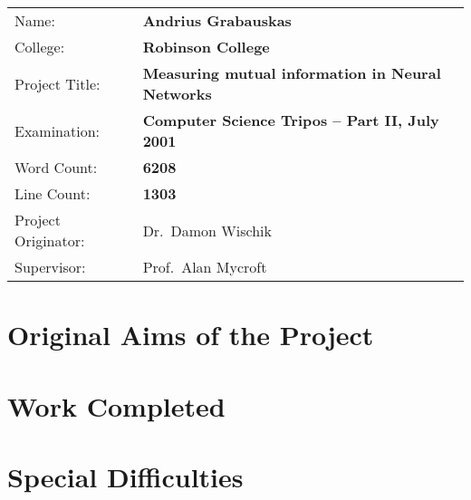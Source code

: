 {\large
\begin{tabular}{ll}
Name:               & \bf Andrius Grabauskas                    \\
College:            & \bf Robinson College                      \\
Project Title:      & \bf Measuring mutual information in Neural Networks \\
Examination:        & \bf Computer Science Tripos -- Part II, July 2001  \\
Word Count:         & \bf 6208\footnotemark[1] \\
Line Count:         & \bf 1303\footnotemark[2] \\
Project Originator: & Dr.\ Damon Wischik                  \\
Supervisor:         & Prof.\ Alan Mycroft                 \\ 
\end{tabular}
}


\section*{Original Aims of the Project}

\section*{Work Completed}

\section*{Special Difficulties}

\newpage
